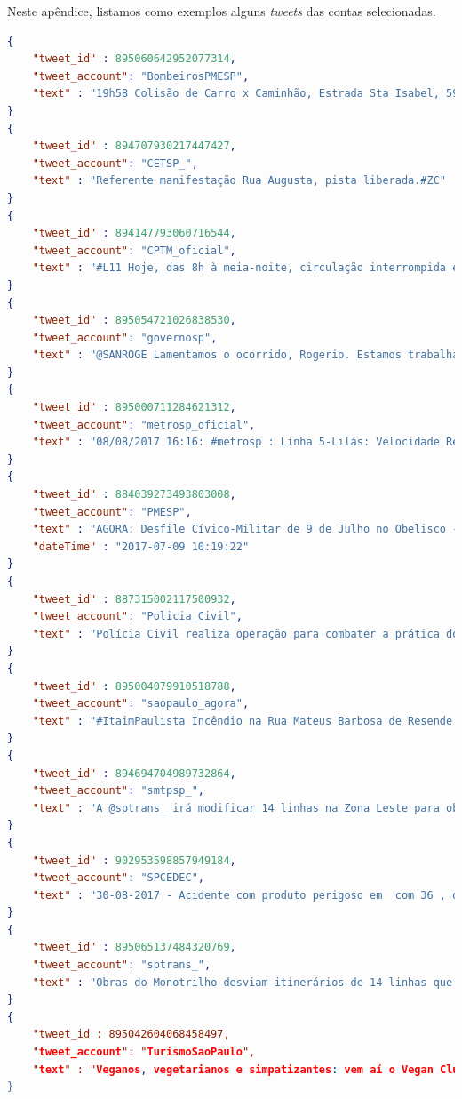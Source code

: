 \documentclass[
	12pt,				%
	oneside,			%
	a4paper,			%
	english,			%
	brazil				%
	]{abntex2ppgsi}
\begin{document}
{{{\begin{apendicesenv}
Neste apêndice, listamos como exemplos alguns \textit{tweets} das contas selecionadas.

\begin{lstlisting}[language=json,title=Exemplos de \textit{tweets} dos perfis selecionados citados na Tabela~\ref{tab:oficialProfiles}, label=tweetsSample]
{
    "tweet_id" : 895060642952077314,
    "tweet_account": "BombeirosPMESP",
    "text" : "19h58 Colisão de Carro x Caminhão, Estrada Sta Isabel, 5950 Itaquaquecetuba. 2 Vítimas, 1 Vtr. Aguardando maiores informes"
}
{
    "tweet_id" : 894707930217447427,
    "tweet_account": "CETSP_",
    "text" : "Referente manifestação Rua Augusta, pista liberada.#ZC"
}
{
    "tweet_id" : 894147793060716544,
    "tweet_account": "CPTM_oficial",
    "text" : "#L11 Hoje, das 8h à meia-noite, circulação interrompida entre Luz e Brás. P/ seguir viagem, use a L7-Rubi q prestará serviço até a Est. Brás"
}
{
    "tweet_id" : 895054721026838530,
    "tweet_account": "governosp",
    "text" : "@SANROGE Lamentamos o ocorrido, Rogerio. Estamos trabalhando continuamente para melhorar a segurança na região. Entre maio e junho, [+] [1]"
}
{
    "tweet_id" : 895000711284621312,
    "tweet_account": "metrosp_oficial",
    "text" : "08/08/2017 16:16: #metrosp : Linha 5-Lilás: Velocidade Reduzida. Mais informações em https://t.co/CaeqD26iJR"
}
{
    "tweet_id" : 884039273493803008,
    "tweet_account": "PMESP",
    "text" : "AGORA: Desfile Cívico-Militar de 9 de Julho no Obelisco - Ibirapuera SP, transmissão ao vivo na página oficial Facebook da Polícia Militar.",
    "dateTime" : "2017-07-09 10:19:22"
}
{
    "tweet_id" : 887315002117500932,
    "tweet_account": "Policia_Civil",
    "text" : "Polícia Civil realiza operação para combater a prática do Jogo conhecido como "Baleia Azul"... https://t.co/kh2HW6UZvT",
}
{
    "tweet_id" : 895004079910518788,
    "tweet_account": "saopaulo_agora",
    "text" : "#ItaimPaulista Incêndio na Rua Mateus Barbosa de Resende nº 235. Defesa Civil Regional acionada para o local. (CCOI) #spagora"
}
{
    "tweet_id" : 894694704989732864,
    "tweet_account": "smtpsp_",
    "text" : "A @sptrans_ irá modificar 14 linhas na Zona Leste para obras no Monotrilho Saiba mais: https://t.co/fCA0T7WCSY"
}
{
    "tweet_id" : 902953598857949184,
    "tweet_account": "SPCEDEC",
    "text" : "30-08-2017 - Acidente com produto perigoso em  com 36 , deixa 21 vítimas feridas e 02 ."
}
{
    "tweet_id" : 895065137484320769,
    "tweet_account": "sptrans_",
    "text" : "Obras do Monotrilho desviam itinerários de 14 linhas que atendem a Av. Sapopemba entre 5 e 11/08, das 23h às 5h: https://t.co/jH4LFgrSKZ"
}
{
    "tweet_id : 895042604068458497,
    "tweet_account": "TurismoSaoPaulo",
    "text" : "Veganos, vegetarianos e simpatizantes: vem aí o Vegan Club, em 12/08, no Centro de SP! #crueltyfree #veganfood... https://t.co/7f7ggr4vn4"
}
\end{lstlisting}


\end{apendicesenv}}}}
\end{document}
